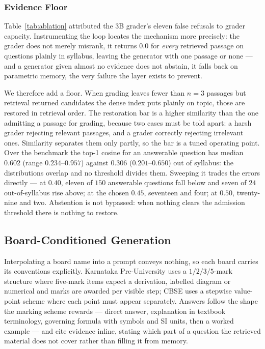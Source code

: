 \documentclass[conference]{IEEEtran}
\begin{document}
\subsubsection{Evidence Floor}
\label{sec:floor}
Table~\ref{tab:ablation} attributed the $3$B grader's eleven false refusals to
grader capacity. Instrumenting the loop locates the mechanism more precisely:
the grader does not merely misrank, it returns $0.0$ for \emph{every} retrieved
passage on questions plainly in syllabus, leaving the generator with one
passage or none --- and a generator given almost no evidence does not abstain,
it falls back on parametric memory, the very failure the layer exists to
prevent.

We therefore add a floor. When grading leaves fewer than $n=3$ passages but
retrieval returned candidates the dense index puts plainly on topic, those are
restored in retrieval order. The restoration bar is a higher similarity than
the one admitting a passage for grading, because two cases must be told apart:
a harsh grader rejecting relevant passages, and a grader correctly rejecting
irrelevant ones. Similarity separates them only partly, so the bar is a tuned
operating point. Over the benchmark the top-1 cosine for an answerable question
has median $0.602$ (range $0.234$--$0.957$) against $0.306$ ($0.201$--$0.650$)
out of syllabus: the distributions overlap and no threshold divides them.
Sweeping it trades the errors directly --- at $0.40$, eleven of $150$ answerable
questions fall below and seven of $24$ out-of-syllabus rise above; at the
chosen $0.45$, seventeen and four; at $0.50$, twenty-nine and two. Abstention
is not bypassed: when nothing clears the admission threshold there is nothing
to restore.

\subsection{Board-Conditioned Generation}
\label{sec:diagram}
Interpolating a board name into a prompt conveys nothing, so each board carries
its conventions explicitly. Karnataka Pre-University uses a $1/2/3/5$-mark
structure where five-mark items expect a derivation, labelled diagram or
numerical and marks are awarded per visible step; CBSE uses a stepwise
value-point scheme where each point must appear separately. Answers follow the
shape the marking scheme rewards --- direct answer, explanation in textbook
terminology, governing formula with symbols and SI units, then a worked example
--- and cite evidence inline, stating which part of a question the retrieved
material does not cover rather than filling it from memory.
\end{document}
